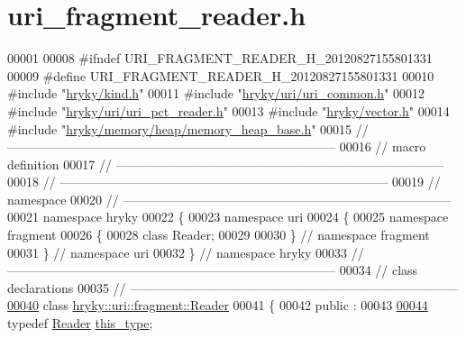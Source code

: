 \hypertarget{uri__fragment__reader_8h_source}{\section{uri\-\_\-fragment\-\_\-reader.\-h}
}

\begin{DoxyCode}
00001 
00008 \textcolor{preprocessor}{#ifndef URI\_FRAGMENT\_READER\_H\_20120827155801331}
00009 \textcolor{preprocessor}{}\textcolor{preprocessor}{#define URI\_FRAGMENT\_READER\_H\_20120827155801331}
00010 \textcolor{preprocessor}{}\textcolor{preprocessor}{#include "\hyperlink{kind_8h}{hryky/kind.h}"}
00011 \textcolor{preprocessor}{#include "\hyperlink{uri__common_8h}{hryky/uri/uri_common.h}"}
00012 \textcolor{preprocessor}{#include "\hyperlink{uri__pct__reader_8h}{hryky/uri/uri_pct_reader.h}"}
00013 \textcolor{preprocessor}{#include "\hyperlink{vector_8h}{hryky/vector.h}"}
00014 \textcolor{preprocessor}{#include "\hyperlink{memory__heap__base_8h}{hryky/memory/heap/memory_heap_base.h}"}
00015 \textcolor{comment}{//
      ------------------------------------------------------------------------------}
00016 \textcolor{comment}{// macro definition}
00017 \textcolor{comment}{//
      ------------------------------------------------------------------------------}
00018 \textcolor{comment}{//
      ------------------------------------------------------------------------------}
00019 \textcolor{comment}{// namespace}
00020 \textcolor{comment}{//
      ------------------------------------------------------------------------------}
00021 \textcolor{keyword}{namespace }hryky
00022 \{
00023 \textcolor{keyword}{namespace }uri
00024 \{
00025 \textcolor{keyword}{namespace }fragment
00026 \{
00028     \textcolor{keyword}{class }Reader;
00029 
00030 \} \textcolor{comment}{// namespace fragment}
00031 \} \textcolor{comment}{// namespace uri}
00032 \} \textcolor{comment}{// namespace hryky}
00033 \textcolor{comment}{//
      ------------------------------------------------------------------------------}
00034 \textcolor{comment}{// class declarations}
00035 \textcolor{comment}{//
      ------------------------------------------------------------------------------}
\hypertarget{uri__fragment__reader_8h_source_l00040}{}\hyperlink{classhryky_1_1uri_1_1fragment_1_1_reader}{00040} \textcolor{comment}{}\textcolor{keyword}{class }\hyperlink{classhryky_1_1uri_1_1fragment_1_1_reader}{hryky::uri::fragment::Reader}
00041 \{
00042 \textcolor{keyword}{public} :
00043 
\hypertarget{uri__fragment__reader_8h_source_l00044}{}\hyperlink{classhryky_1_1uri_1_1fragment_1_1_reader_ae537bbb2c10b19dc5e44b148a67132f0}{00044}     \textcolor{keyword}{typedef} \hyperlink{classhryky_1_1uri_1_1fragment_1_1_reader}{Reader} \hyperlink{classhryky_1_1uri_1_1fragment_1_1_reader_ae537bbb2c10b19dc5e44b148a67132f0}{this_type};

\end{DoxyCode}
